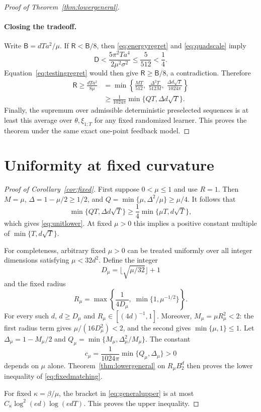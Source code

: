 \documentclass[11pt]{article}
\numberwithin{equation}{section}
\theoremstyle{definition}
\theoremstyle{remark}
\begin{document}
\begin{proof}[Proof of Theorem~\ref{thm:lowergeneral}]
\paragraph{Closing the tradeoff.}
Write $\mathsf B=dTa^2/\mu$. If $\mathsf R<\mathsf B/8$, then
\eqref{eq:energyregret} and \eqref{eq:quadscale} imply
\[
 \mathsf D<\frac{5\pi^2Ta^4}{2\mu^2\sigma^2}
 \leq\frac5{512}<\frac14.
\]
Equation~\eqref{eq:testingregret} would then give
$\mathsf R\geq\mathsf B/8$, a contradiction. Therefore
\begin{align*}
 \mathsf R\geq\frac{dTa^2}{8\mu}
 &=\min\!\left\{\frac{MT}{512},\;
                 \frac{\Delta^2T}{512M},\;
                 \frac{\Delta d\sqrt T}{1024\pi}\right\}\\
 &\geq\frac1{1024\pi}\min\{QT,\Delta d\sqrt T\}.
\end{align*}
Finally, the supremum over admissible deterministic preselected sequences is
at least this average over $\theta,\xi_{1:T}$ for any fixed randomized learner.
This proves the theorem under the same exact one-point feedback model.
\end{proof}

\section{Uniformity at fixed curvature}\label{app:fixed}
\begin{proof}[Proof of Corollary~\ref{cor:fixed}]
First suppose $0<\mu\leq1$ and use $R=1$. Then $M=\mu$,
$\Delta=1-\mu/2\geq1/2$, and
$Q=\min\{\mu,\Delta^2/\mu\}\geq\mu/4$. It follows that
\[
 \min\{QT,\Delta d\sqrt T\}
 \geq\frac14\min\{\mu T,d\sqrt T\},
\]
which gives \eqref{eq:unitlower}. At fixed $\mu>0$ this implies a positive
constant multiple of $\min\{T,d\sqrt T\}$.

For completeness, arbitrary fixed $\mu>0$ can be treated uniformly over all
integer dimensions satisfying $\mu<32d^2$. Define the integer
\[
 D_\mu=\lfloor\sqrt{\mu/32}\rfloor+1
\]
and the fixed radius
\[
 R_\mu=\max\!\left\{\frac1{4D_\mu},\;
                               \min\{1,\mu^{-1/2}\}\right\}.
\]
For every such $d$, $d\geq D_\mu$ and
$R_\mu\in[(4d)^{-1},1]$. Moreover,
$M_\mu=\mu R_\mu^2<2$: the first radius term gives
$\mu/(16D_\mu^2)<2$, and the second gives $\min\{\mu,1\}\leq1$.
Let $\Delta_\mu=1-M_\mu/2$ and
$Q_\mu=\min\{M_\mu,\Delta_\mu^2/M_\mu\}$. The constant
\[
 c_\mu=\frac1{1024\pi}\min\{Q_\mu,\Delta_\mu\}>0
\]
depends on $\mu$ alone. Theorem~\ref{thm:lowergeneral} on $R_\mu B_2^d$ then
proves the lower inequality of \eqref{eq:fixedmatching}.

For fixed $\kappa=\beta/\mu$, the bracket in \eqref{eq:generalupper} is at
most $C_\kappa\log^2(ed)\log(edT)$. This proves the upper inequality.
\end{proof}
\end{document}
